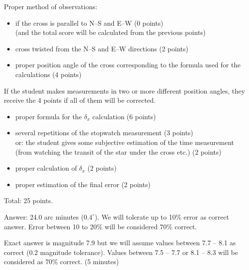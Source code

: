 Proper method of observations:
\begin{itemize}
\item if the cross is parallel to N--S and E--W \hfill(0 points)\\
  (and the total score will be calculated from the previous points)
\item cross twisted from the N--S and E--W directions \hfill(2 points)
\item proper position angle of the cross corresponding to the formula used
  for the calculations \hfill(4 points)
\end{itemize}
If the student makes measurements in two or more different position angles,
they receive the 4 points if all of them will be corrected. %

\begin{itemize}
\item proper formula for the $\delta_x$ calculation \hfill(6 points)
\item several repetitions of the stopwatch measurement \hfill(3 points)\\
  or: the student gives some subjective estimation of the time measurement
  (from watching the transit of the star under the cross etc.)
  \hfill(2 points)
\item proper calculation of $\delta_x$ \hfill(2 points)
\item proper estimation of the final error \hfill(2 points)
\end{itemize}

Total: 25 points.

Answer: 24.0 arc minutes ($0.4^\circ$). We will tolerate up to 10\% error
as correct answer. Error between 10 to 20\% will be considered 70\%
correct.


Exact answer is magnitude 7.9 but we will assume values between 7.7 -- 8.1 as
correct (0.2 magnitude tolerance). Values between 7.5 -- 7.7 or 8.1 -- 8.3
will be considered as 70\% correct. (5 minutes)


